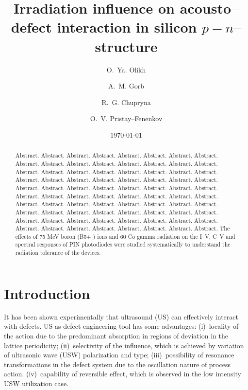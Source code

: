\documentclass[aip,jap,reprint]{revtex4-1}
\begin{document}
\title{Irradiation influence on  acousto--defect interaction in silicon $p-n$--structure}
\author{O.~Ya. Olikh}


\author{A.~M. Gorb}


\author{R.~G. Chupryna}

\author{O.~V. Pristay--Fenenkov}%





\date{\today}

\begin{abstract}
Abstract. Abstract. Abstract. Abstract. Abstract. Abstract. Abstract.
Abstract. Abstract. Abstract. Abstract. Abstract.
Abstract. Abstract. Abstract. Abstract. Abstract.
Abstract. Abstract. Abstract.
Abstract. Abstract. Abstract. Abstract.
Abstract. Abstract. Abstract. Abstract. Abstract.
Abstract. Abstract. Abstract.
Abstract. Abstract. Abstract.
Abstract. Abstract. Abstract. Abstract.
Abstract.
Abstract. Abstract. Abstract. Abstract. Abstract. Abstract. Abstract.
Abstract. Abstract. Abstract. Abstract. Abstract.
Abstract. Abstract. Abstract. Abstract. Abstract.
Abstract. Abstract. Abstract.
Abstract. Abstract. Abstract. Abstract.
Abstract. Abstract. Abstract. Abstract. Abstract.
Abstract. Abstract. Abstract.
Abstract. Abstract. Abstract.
Abstract. Abstract. Abstract. Abstract.
Abstract.
The
effects of 75 MeV boron (B5+
) ions and 60
Co gamma radiation on the I–V, C–V and spectral responses of
PIN photodiodes were studied systematically to understand the radiation tolerance of the devices.
\end{abstract}


\maketitle %

\section{Introduction}
It has been shown experimentally that ultrasound (US) can effectively interact with defects.
US as defect engineering tool has some advantages:
(i)~locality of the action due to the predominant absorption in regions of deviation in the lattice periodicity;
(ii)~selectivity of the influence, which is achieved by variation of ultrasonic wave (USW) polarization and type;
(iii)~possibility of resonance transformations in the defect system due to the oscillation nature of process action.
(iv)~capability of reversible effect, which is observed in the low intensity USW utilization case.
\end{document}
